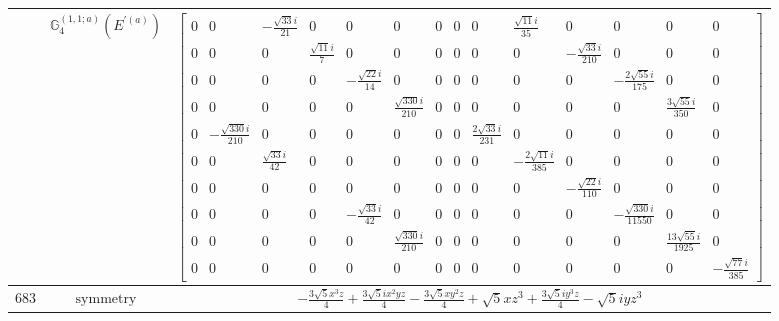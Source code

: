 \documentclass[fleqn,8pt,landscape]{jsarticle}
\begin{document}
\begin{longtable}{ccc}
$  $ & $ \mathbb{G}_{4}^{(1,1;a)}(E^{\prime(a)}) $ & $ \begin{bmatrix} 0 & 0 & - \frac{\sqrt{33} i}{21} & 0 & 0 & 0 & 0 & 0 & 0 & \frac{\sqrt{11} i}{35} & 0 & 0 & 0 & 0 \\ 0 & 0 & 0 & \frac{\sqrt{11} i}{7} & 0 & 0 & 0 & 0 & 0 & 0 & - \frac{\sqrt{33} i}{210} & 0 & 0 & 0 \\ 0 & 0 & 0 & 0 & - \frac{\sqrt{22} i}{14} & 0 & 0 & 0 & 0 & 0 & 0 & - \frac{2 \sqrt{55} i}{175} & 0 & 0 \\ 0 & 0 & 0 & 0 & 0 & \frac{\sqrt{330} i}{210} & 0 & 0 & 0 & 0 & 0 & 0 & \frac{3 \sqrt{55} i}{350} & 0 \\ 0 & - \frac{\sqrt{330} i}{210} & 0 & 0 & 0 & 0 & 0 & 0 & \frac{2 \sqrt{33} i}{231} & 0 & 0 & 0 & 0 & 0 \\ 0 & 0 & \frac{\sqrt{33} i}{42} & 0 & 0 & 0 & 0 & 0 & 0 & - \frac{2 \sqrt{11} i}{385} & 0 & 0 & 0 & 0 \\ 0 & 0 & 0 & 0 & 0 & 0 & 0 & 0 & 0 & 0 & - \frac{\sqrt{22} i}{110} & 0 & 0 & 0 \\ 0 & 0 & 0 & 0 & - \frac{\sqrt{33} i}{42} & 0 & 0 & 0 & 0 & 0 & 0 & - \frac{\sqrt{330} i}{11550} & 0 & 0 \\ 0 & 0 & 0 & 0 & 0 & \frac{\sqrt{330} i}{210} & 0 & 0 & 0 & 0 & 0 & 0 & \frac{13 \sqrt{55} i}{1925} & 0 \\ 0 & 0 & 0 & 0 & 0 & 0 & 0 & 0 & 0 & 0 & 0 & 0 & 0 & - \frac{\sqrt{77} i}{385} \end{bmatrix} $ \\ \hline
$ 683 $ & $ \text{symmetry} $ & $ - \frac{3 \sqrt{5} x^{3} z}{4} + \frac{3 \sqrt{5} i x^{2} y z}{4} - \frac{3 \sqrt{5} x y^{2} z}{4} + \sqrt{5} x z^{3} + \frac{3 \sqrt{5} i y^{3} z}{4} - \sqrt{5} i y z^{3} $ \\

\end{longtable}
\end{document}
